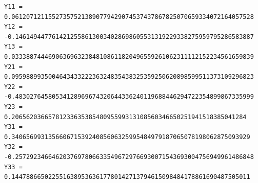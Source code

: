 \begingroup\small
\begin{verbatim}
Y11 = 0.061207121155273575213890779429074537437867825070659334072164057528
Y12 = -0.14614944776142125586130034028698605531319229338275959795286583887
Y13 = 0.033388744469063696323848108611820496559261062311112152234561659839
Y21 = 0.095988993500464343322236324835438325359250620898599511373109296823
Y22 = -0.48302764580534128969674320644336240119688446294722354899867335999
Y23 = 0.2065620366578123363538548095599313108560346650251941518385041284
Y31 = 0.34065699313566067153924085606325995484979187065078198062875093929
Y32 = -0.25729234664620376978066335496729766930071543693004756949961486848
Y33 = 0.14478866502255163895363617780142713794615098484178861690487505011
\end{verbatim}
\endgroup
